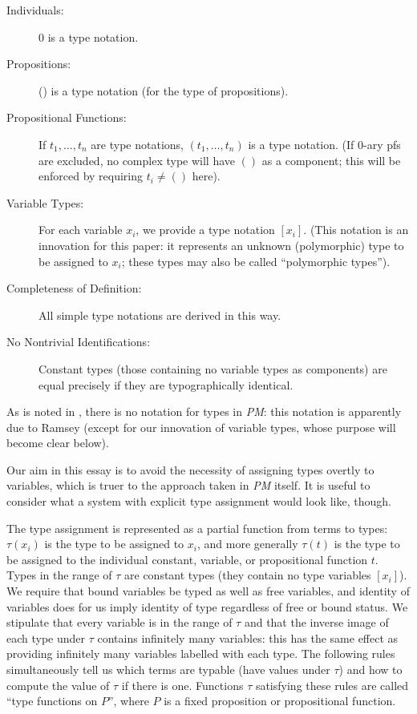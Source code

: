 \documentclass{article}
\begin{document}
\begin{description}

\item[Individuals:]  0 is a type notation.

\item[Propositions:]  () is a type notation (for the type of propositions).

\item[Propositional Functions:] If $t_1,\ldots,t_n$ are type
notations, $(t_1,\ldots,t_n)$ is a type notation.  (If 0-ary pfs are
excluded, no complex type will have $()$ as a component; this will be
enforced by requiring $t_i \neq ()$ here).

\item[Variable Types:] For each variable $x_i$, we provide a type
notation $[x_i]$.  (This notation is an innovation for this paper: it
represents an unknown (polymorphic) type to be assigned to $x_i$;
these types may also be called ``polymorphic types'').

\item[Completeness of Definition:] All simple type notations are
derived in this way.

\item[No Nontrivial Identifications:] Constant types (those containing no variable types as components) are equal precisely if they are typographically identical.

\end{description}

As is noted in \cite{types40}, there is no notation for types in {\em
PM\/}: this notation is apparently due to Ramsey (except for our
innovation of variable types, whose purpose will become clear below).

Our aim in this essay is to avoid the necessity of assigning types
overtly to variables, which is truer to the approach taken in {\em
PM\/} itself.  It is useful to consider what a system with explicit
type assignment would look like, though.

The type assignment is represented as a partial function from terms to
types: $\tau(x_i)$ is the type to be assigned to $x_i$, and more
generally $\tau(t)$ is the type to be assigned to the individual
constant, variable, or propositional function $t$.  Types in the range
of $\tau$ are constant types (they contain no type variables $[x_i]$).
We require that bound variables be typed as well as free variables,
and identity of variables does for us imply identity of type
regardless of free or bound status.  We stipulate that every variable
is in the range of $\tau$ and that the inverse image of each type
under $\tau$ contains infinitely many variables: this has the same
effect as providing infinitely many variables labelled with each type.
The following rules simultaneously tell us which terms are typable
(have values under $\tau$) and how to compute the value of $\tau$ if
there is one.  Functions $\tau$ satisfying these rules are called
``type functions on $P$'', where $P$ is a fixed proposition or
propositional function.
\end{document}
